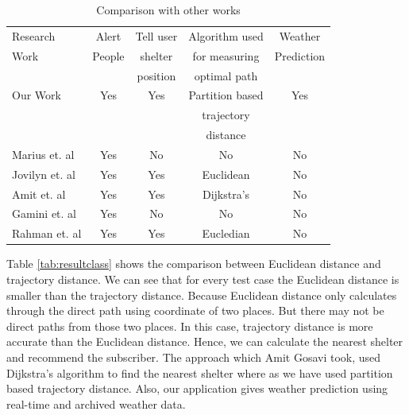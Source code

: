 \documentclass[conference]{IEEEtran}
\begin{document}
\begin{table}[htp]
\centering
\caption{Comparison with other works }

\begin{tabular}{|l|c|c|c|c|}
\hline
Research& Alert & Tell user  & Algorithm used  & Weather  \\
Work & People & shelter & for measuring & Prediction\\
& & position & optimal path & \\
\hline
Our Work & Yes & Yes & Partition based& Yes \\
& & & trajectory & \\
& & &distance & \\
\hline

Marius et. al\cite{cioca2008sms} & Yes & No & No & No \\
\hline
Jovilyn et. al\cite{fajardo2010implementation} & Yes & Yes & Euclidean & No \\
\hline

Amit et. al\cite{amit2014} & Yes & Yes & Dijkstra's & No \\
\hline

Gamini et. al\cite{jayasinghe2006gsm} & Yes & No & No & No \\
\hline

Rahman et. al\cite{rahman2012location} & Yes & Yes & Eucledian & No \\
\hline

\end{tabular}
\label{tab:comparison}
\end{table}

Table \ref{tab:resultclass} shows the comparison between Euclidean distance and trajectory distance. We can see that for every test case the Euclidean distance is smaller than the trajectory distance. Because Euclidean distance only calculates through the direct path using coordinate of two places. But there may not be direct paths from those two places. In this case, trajectory distance is more accurate than the Euclidean distance. Hence, we can calculate the nearest shelter and recommend the subscriber. The approach which Amit Gosavi \cite{amit2014} took, used Dijkstra's algorithm to find the nearest shelter where as we have used partition based trajectory distance. Also, our application gives weather prediction using real-time and archived weather data.
\end{document}
